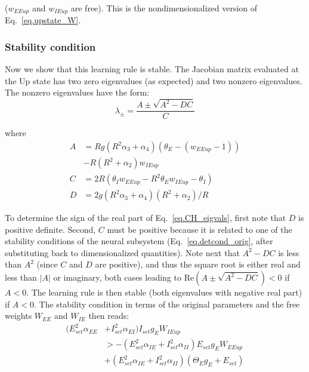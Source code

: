 \documentclass[
twocolumn,
]{article}
\newcommand{\EE}{\mathit{EE}}
\newcommand{\EI}{\mathit{EI}}
\newcommand{\IE}{\mathit{IE}}
\newcommand{\II}{\mathit{II}}
\newcommand{\set}{\mathit{set}}
\newcommand{\up}{\mathit{up}}
\newcommand{\RE}{\mathrm{Re}}
\begin{document}
\noindent ($w_{\EE\up}$ and $w_{\IE\up}$ are free). This is the nondimensionalized version of Eq.\ \ref{eq.upstate_W}.


\subsubsection{Stability condition}

Now we show that this learning rule is stable. The Jacobian matrix evaluated at the Up state has two zero eigenvalues (as expected) and two nonzero eigenvalues. The nonzero eigenvalues have the form:
\begin{equation}
\lambda_{\pm} = \frac{A \pm \sqrt{A^2 - DC}}{C}
\label{eq.CH_eigvals}
\end{equation}

\noindent where
\begin{displaymath}
\begin{aligned}
A & = Rg(R^2 \alpha_3 + \alpha_4)(\theta_E - (w_{\EE\up} - 1)) \\
& - R(R^2 + \alpha_2)w_{\IE\up} \\
C & = 2R(\theta_I w_{\EE\up} - R^2\theta_E w_{\IE\up}  - \theta_I) \\
D & = 2g(R^2\alpha_3 + \alpha_4)(R^2 + \alpha_2)/R
\end{aligned}
\end{displaymath}


To determine the sign of the real part of Eq.\ \ref{eq.CH_eigvals}, first note that $D$ is positive definite. Second, $C$ must be positive because it is related to one of the stability conditions of the neural subsystem (Eq.\ \ref{eq.detcond_orig}, after substituting back to dimensionalized quantities). Note next that $A^2 - DC$ is less than $A^2$ (since $C$ and $D$ are positive), and thus the square root is either real and less than $|A|$ or imaginary, both cases leading to $\RE(A \pm \sqrt{A^2-DC}) < 0$ if $A<0$. The learning rule is then stable (both eigenvalues with negative real part) if $A<0$. The stability condition in terms of the original parameters and the free weights $W_{\EE}$ and $W_{\IE}$ then reads:
\begin{equation}
\begin{aligned}
(E_{\set}^2 \alpha_{\EE} & + I_{\set}^2 \alpha_{\EI}) I_{\set} g_E W_{\IE\up} \\
& >
-(E_{\set}^2 \alpha_{\IE} + I_{\set}^2 \alpha_{\II}) E_{\set} g_E W_{\EE\up} \\
& +
(E_{\set}^2 \alpha_{\IE} + I_{\set}^2 \alpha_{\II}) (\Theta_E g_E + E_{\set})
\end{aligned}
\label{eq.CH_stable_cond_v1}
\end{equation}
\end{document}
